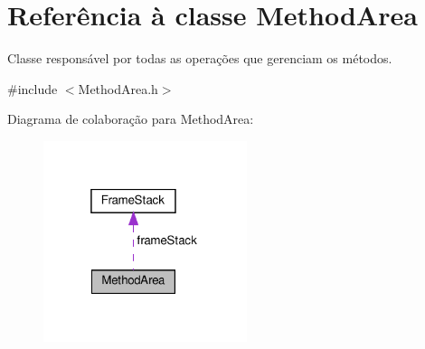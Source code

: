 \hypertarget{classMethodArea}{}\section{Referência à classe Method\+Area}
\label{classMethodArea}


Classe responsável por todas as operações que gerenciam os métodos.  




{\ttfamily \#include $<$Method\+Area.\+h$>$}



Diagrama de colaboração para Method\+Area\+:
\nopagebreak
\begin{figure}[H]
\begin{center}
\leavevmode
\includegraphics[width=169pt]{classMethodArea__coll__graph}
\end{center}
\end{figure}
